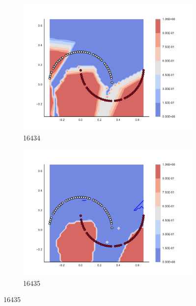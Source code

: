 \begin{figure}[h]
\begin{subfigure}[b]{0.09\textwidth}
    \includegraphics[clip, trim=2.35cm 1.75cm 4.5cm 0cm,width=\textwidth]{img/convergence/16434.pdf}
    \caption{16434}
    \label{fig:convergence_16434}
\end{subfigure}
%
\begin{subfigure}[b]{0.09\textwidth}
    \includegraphics[clip, trim=2.35cm 1.75cm 4.5cm 0cm,width=\textwidth]{img/convergence/16435.pdf}
    \caption{16435}
    \label{fig:convergence_16435}
\end{subfigure}
%
        \end{figure}
